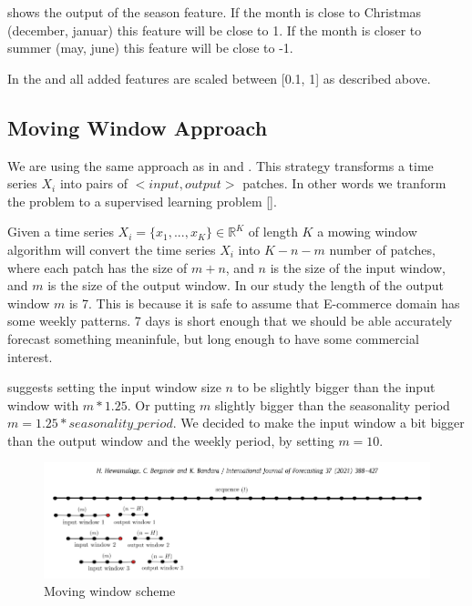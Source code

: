  shows the output of the season feature.
If the month is close to Christmas (december, januar) this feature will be close to 1.
If the month is closer to summer (may, june) this feature will be close to -1.

In the and all added features are scaled between [0.1, 1] as described above.

\subsection{Moving Window Approach}
We are using the same approach  as in \cite{Bandara2019} %
and \cite{Hewamalage2021}.%
This strategy transforms a time series $X_i$ into pairs of $<input, output>$ patches.
In other words we tranform the problem to a supervised learning problem [].

Given a time series $X_i = \{x_1, ..., x_K\} \in \mathbb{R}^K$ of length $K$ a mowing
window algorithm will convert the time series $X_i$ into $K-n-m$ number of patches,
where each patch has the size of $m+n$, and $n$ is the size of the input window,
and $m$ is the size of the output window.
In our study the length of the output window $m$ is 7. This is because
it is safe to assume that E-commerce domain has some weekly patterns.
7 days is short enough that we should be able accurately forecast something meaninfule,
but long enough to have some commercial interest.

\cite{Hewamalage2021} suggests setting the input window size $n$ to be slightly
bigger than the input window with $m * 1.25$. Or putting $m$ slightly bigger than
the seasonality period $m = 1.25 * seasonality\_period$.
We decided to make the input window a bit bigger than the output window and the weekly
period, by setting $m = 10$.
\begin{figure}[h!]
  \centering
  \includegraphics[width=\textwidth]{./figs/illustrations/moving_window_illustration.png}
  \hfill
  \caption{Moving window scheme \citep{Hewamalage2021}}
  \label{fig:dataset:moving_window_scheme}
\end{figure}

